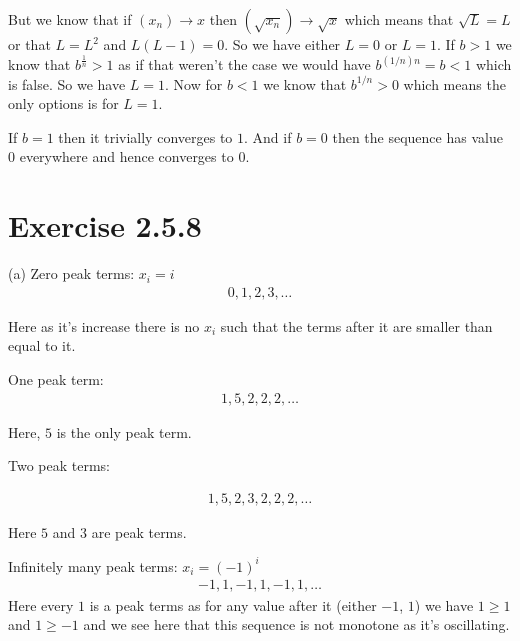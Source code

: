\documentclass[a4paper]{report}
\begin{document}
But we know that if $(x_n) \to x$ then $(\sqrt{x_n}) \to \sqrt{x}$ which means that $\sqrt{L} = L$ or that $L = L^2$ and $L(L - 1) = 0$. So we have either $L = 0$ or $L = 1$. If $b > 1$ we know that $b^{\frac{1}{n}} > 1$ as if that weren't the case we would have $b^{(1 / n){n}}  = b < 1$ which is false. So we have $L = 1$. Now for $b < 1$ we know that $b^{1 / n} > 0$ which means the only options is for $L = 1$. 

\vspace{1em}

If $b = 1$ then it trivially converges to $1$. And if $b = 0$ then the sequence has value $0$ everywhere and hence converges to $0$.

\section*{Exercise 2.5.8}

(a) Zero peak terms: $x_i = i$
\begin{align*}
	0, 1, 2, 3, \dots
\end{align*}

Here as it's increase there is no $x_i$ such that the terms after it are smaller than equal to it.

\vspace{1em}
One peak term:
\begin{align*}
	1, 5, 2, 2, 2, \dots
\end{align*}

Here, $5$ is the only peak term.

\vspace{1em}

Two peak terms:

\begin{align*}
	1, 5, 2, 3, 2, 2, 2,  \dots
\end{align*}

Here $5$ and $3$ are peak terms. 

\vspace{1em}

Infinitely many peak terms: $x_i = (-1)^{i}$
\begin{align*}
	-1, 1, -1, 1, -1, 1, \dots
\end{align*}
Here every  $1$ is a peak terms as for any value after it (either $-1$, $1$) we have $1 \ge 1$ and $1 \ge -1$ and we see here that this sequence is not monotone as it's oscillating.

\vspace{1em}
\end{document}
